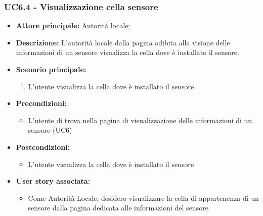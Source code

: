 \subsubsection{UC6.4 - Visualizzazione cella sensore}
\begin{itemize}
    \item \textbf{Attore principale:} Autorità locale;
    \item \textbf{Descrizione:} L’autorità locale dalla pagina adibita alla visione delle informazioni di un sensore visualizza la cella dove è installato il sensore.
    \item \textbf{Scenario principale:}
          \begin{enumerate}
              \item L'utente visualizza la cella dove è installato il sensore
          \end{enumerate}
    \item \textbf{Precondizioni:}
          \begin{itemize}
              \item  L'utente di trova nella pagina di visualizzazione delle informazioni di un sensore (UC6)
          \end{itemize}
    \item \textbf{Postcondizioni:}
          \begin{itemize}
              \item  L'utente visualizza la cella dove è installato il sensore
          \end{itemize}
    \item \textbf{User story associata:}
          \begin{itemize}
              \item Come Autorità Locale, desidero visualizzare la cella di appartenenza di un sensore dalla pagina dedicata alle informazioni del sensore.
          \end{itemize}
\end{itemize}